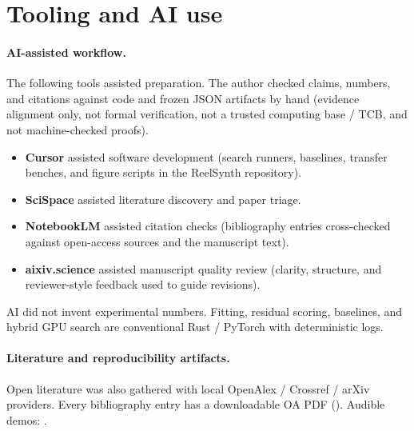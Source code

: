 \section{Tooling and AI use}
\label{sec:tooling}

\paragraph{AI-assisted workflow.}
The following tools assisted preparation.
The author checked claims, numbers, and citations against code and frozen JSON artifacts by hand
(evidence alignment only, not formal verification, not a trusted computing base / TCB, and not machine-checked proofs).
\begin{itemize}
  \item \textbf{Cursor} assisted software development (search runners, baselines, transfer benches, and figure scripts in the ReelSynth repository).
  \item \textbf{SciSpace} assisted literature discovery and paper triage.
  \item \textbf{NotebookLM} assisted citation checks (bibliography entries cross-checked against open-access sources and the manuscript text).
  \item \textbf{aixiv.science} assisted manuscript quality review (clarity, structure, and reviewer-style feedback used to guide revisions).
\end{itemize}
AI did not invent experimental numbers.
Fitting, residual scoring, baselines, and hybrid GPU search are conventional Rust / PyTorch with deterministic logs.

\paragraph{Literature and reproducibility artifacts.}
Open literature was also gathered with local OpenAlex / Crossref / arXiv providers. Every bibliography entry has a downloadable OA PDF
().
Audible demos:
.
